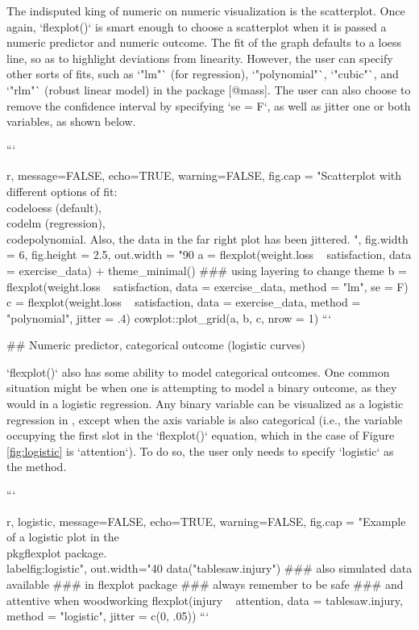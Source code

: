 {{{The indisputed king of numeric on numeric visualization is the scatterplot. Once again, `flexplot()` is smart enough to choose a scatterplot when it is passed a numeric predictor and numeric outcome. The fit of the graph defaults to a loess line, so as to highlight deviations from linearity. However, the user can specify other sorts of fits, such as `"lm"` (for regression), `"polynomial"`, `"cubic"`, and `"rlm"` (robust linear model) in the  package [@mass]. The user can also choose to remove the confidence interval by specifying `se = F`, as well as jitter one or both variables, as shown below. 

```{r, message=FALSE, echo=TRUE, warning=FALSE, fig.cap = "Scatterplot with different options of fit: \\code{loess} (default), \\code{lm} (regression), \\code{polynomial}. Also, the data in the far right plot has been jittered. ", fig.width = 6, fig.height = 2.5, out.width = "90%
a = flexplot(weight.loss ~ satisfaction, data = exercise_data) + 
  theme_minimal() ### using layering to change theme
b = flexplot(weight.loss ~ satisfaction, data = exercise_data, 
             method = "lm", se = F)
c = flexplot(weight.loss ~ satisfaction, data = exercise_data, 
             method = "polynomial", jitter = .4)
cowplot::plot_grid(a, b, c, nrow = 1)
```


## Numeric predictor, categorical outcome (logistic curves)

`flexplot()` also has some ability to model categorical outcomes. One common situation might be when one is attempting to model a binary outcome, as they would in a logistic regression. Any binary variable can be visualized as a logistic regression in , except when the axis variable is also categorical (i.e., the variable occupying the first slot in the `flexplot()` equation, which in the case of Figure \ref{fig:logistic} is `attention`). To do so, the user only needs to specify `logistic` as the method. 

```{r, logistic, message=FALSE, echo=TRUE, warning=FALSE, fig.cap = "Example of a logistic plot in the \\pkg{flexplot} package.\\label{fig:logistic}", out.width="40%
data("tablesaw.injury") ### also simulated data available 
                        ### in flexplot package
                        ### always remember to be safe 
                        ### and attentive when woodworking
flexplot(injury ~ attention, data = tablesaw.injury, 
             method = "logistic", jitter = c(0, .05))
```

}}}}}
